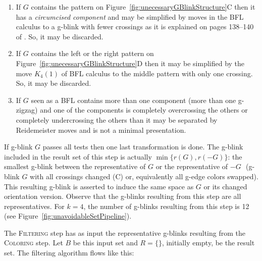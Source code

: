\begin{enumerate}
\item If $G$ contains the pattern on
Figure~\ref{fig:unecessaryGBlinkStructure}C then it has a {\it
circumcised component} and may be simplified by moves in the BFL
calculus to a g-blink with fewer crossings as it is explained on
pages 138--140 of \cite{KauffmanAndLins1994}. So, it may be discarded.

\item If $G$ contains the left or the right pattern on
Figure~\ref{fig:unecessaryGBlinkStructure}D then it may be simplified
by the move $K_4(1)$ of BFL calculus to the middle pattern with only
one crossing. So, it may be discarded.

\item If $G$ seen as a BFL contains more than one
component (more than one g-zigzag) and one of the components is completely
overcrossing the others or completely undercrossing the others than it may
be separated by Reidemeister moves and is not a minimal presentation.
\end{enumerate}
If g-blink $G$ passes all tests then one last transformation is done.
The g-blink included in the result set of this step is
actually $\min\{r(G), r(-G)\}$: the smallest g-blink
between the representative of $G$ or the representative of $-G$
\,\,(\ie g-blink $G$ with all crossings changed (C) or, equivalently
all g-edge colors swapped). This resulting g-blink is asserted to
induce the same space as $G$ or its changed orientation version. Observe
that the g-blinks resulting from this step are all representatives.  For $k=4$,
the number of g-blinks resulting from this step is 12 (see
Figure~\ref{fig:unavoidableSetPipeline}).

The \textsc{Filtering} step has as input the representative
g-blinks resulting from the \textsc{Coloring} step. Let $B$ be this
input set and $R = \{\}$, initially empty, be the result set.
The filtering algorithm flows like this:

